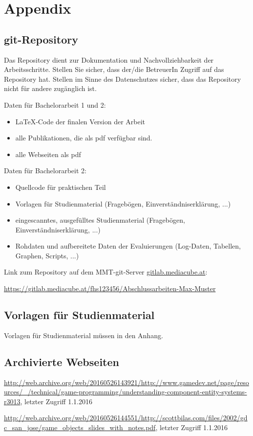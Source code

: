 \appendix

\section*{Appendix}
\renewcommand{\thesubsection}{\Alph{subsection}}

\subsection{git-Repository}

Das Repository dient zur Dokumentation und Nachvollziehbarkeit der Arbeitsschritte. Stellen Sie sicher, dass der/die BetreuerIn Zugriff auf das Repository hat. Stellen im Sinne des Datenschutzes sicher, dass das Repository nicht für andere zugänglich ist.

Daten für Bachelorarbeit 1 und 2:

\begin{itemize}
	\item LaTeX-Code der finalen Version der Arbeit
	\item alle Publikationen, die als pdf verfügbar sind.
	\item alle Webseiten als pdf
\end{itemize}

Daten für Bachelorarbeit 2:
\begin{itemize}
	\item Quellcode für praktischen Teil
	\item Vorlagen für Studienmaterial (Fragebögen, Einverständniserklärung, ...)	
	\item eingescanntes, ausgefülltes Studienmaterial (Fragebögen, Einverständniserklärung, ...)
	\item Rohdaten und aufbereitete Daten der Evaluierungen (Log-Daten, Tabellen, Graphen, Scripts, ...)	
\end{itemize}

Link zum Repository auf dem MMT-git-Server {\url{gitlab.mediacube.at}}:

{\color{red}\url{https://gitlab.mediacube.at/fhs123456/Abschlussarbeiten-Max-Muster}}
	
\subsection{Vorlagen für Studienmaterial}

Vorlagen für Studienmaterial müssen in den Anhang. 

\subsection{Archivierte Webseiten}

\url{http://web.archive.org/web/20160526143921/http://www.gamedev.net/page/resources/_/technical/game-programming/understanding-component-entity-systems-r3013}, letzter Zugriff 1.1.2016

\url{http://web.archive.org/web/20160526144551/http://scottbilas.com/files/2002/gdc_san_jose/game_objects_slides_with_notes.pdf}, letzter Zugriff 1.1.2016


